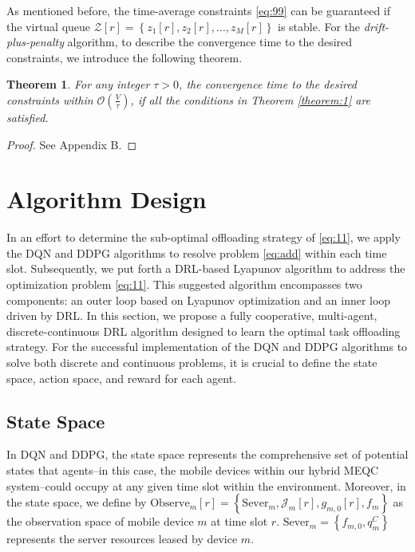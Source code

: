 \documentclass[journal]{IEEEtran}
\newtheorem{theorem}{Theorem}
\newtheorem{proof}{Proof}
\begin{document}
As mentioned before, the time-average constraints \eqref{eq:99} can be guaranteed if the virtual queue $\mathcal{Z}[r]=\left\{ z_1[r],z_2[r],\dots,z_M[r]\right\}$ is stable. For the {\em drift-plus-penalty} algorithm, to describe the convergence time to the desired constraints, we introduce the following theorem.
\begin{theorem}\label{theorem:2}
    For any integer $\tau >0$, the convergence time to the desired constraints within $\mathcal{O}\left( \frac{V}{\tau}\right)$, if all the conditions in Theorem \ref{theorem:1} are satisfied.
\end{theorem}

\begin{proof}
    See Appendix B.
\end{proof}

\section{Algorithm Design}
In an effort to determine the sub-optimal offloading strategy of \eqref{eq:11}, we apply the DQN and DDPG algorithms to resolve problem \eqref{eq:add} within each time slot. Subsequently, we put forth a DRL-based Lyapunov algorithm to address the optimization problem \eqref{eq:11}.
This suggested algorithm encompasses two components: an outer loop based on Lyapunov optimization and an inner loop driven by DRL. In this section, we propose a fully cooperative, multi-agent, discrete-continuous DRL algorithm designed to learn the optimal task offloading strategy.
For the successful implementation of the DQN and DDPG algorithms to solve both discrete and continuous problems, it is crucial to define the state space, action space, and reward for each agent.

\subsection{State Space}
In DQN and DDPG, the state space represents the comprehensive set of potential states that agents--in this case, the mobile devices within our hybrid MEQC system--could occupy at any given time slot within the environment.
Moreover, in the state space, we define by $\text{Observe}_m[r]=\left\{\text{Sever}_m, \mathcal{J}_m[r], g_{m,0}[r], f_m\right\}$ as the observation space of mobile device $m$ at time slot $r$. $\text{Sever}_m=\left\{f_{m,0},q_m^C\right\}$ represents the server resources leased by device $m$.
\end{document}
